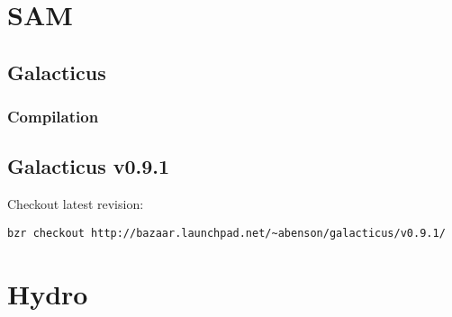 \documentclass[a4paper,english,10.5pt]{scrartcl}
\begin{document}
\section{SAM}
\subsection{Galacticus}
\subsubsection{Compilation}


\subsection{Galacticus v0.9.1}

Checkout latest revision: 
\begin{verbatim}
bzr checkout http://bazaar.launchpad.net/~abenson/galacticus/v0.9.1/
\end{verbatim}

\section{Hydro}


\renewcommand{\bibsection}{\section{References}}
\setlength{\bibhang}{1.24cm}
\setlength{\parindent}{3cm}
\setlength{\bibsep}{0cm}

\gdef\harvardand{\&}
\end{document}

